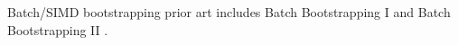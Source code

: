 
Batch/SIMD bootstrapping prior art includes Batch Bootstrapping I
\cite{DBLP:conf/eurocrypt/LiuW23} and Batch Bootstrapping II
\cite{DBLP:conf/eurocrypt/LiuW23a}.


